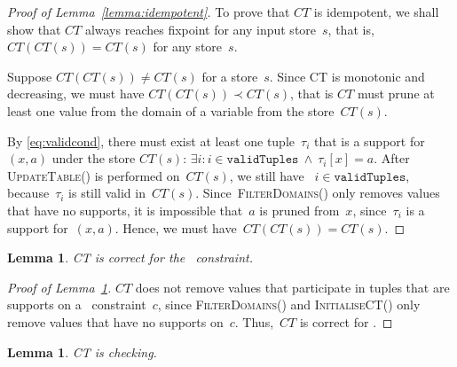 \documentclass[a4paper,11pt]{article}
\newtheorem{lemma}[theorem]{Lemma}
\newcommand{\Table}{\Constraint{Table}}
\newcommand{\Lemmaref}[1]{Lemma~\ref{#1}}
\newcommand{\Eqref}[1]{\eqref{#1}}
\newcommand{\CurrTable}{\texttt{validTuples}}
\def\UpdateTable{\textsc{UpdateTable}}
\def\FilterDomains{\textsc{FilterDomains}}
\def\InitialiseCT{\textsc{InitialiseCT}}
\numberwithin{equation}{section}
\begin{document}
\begin{proof}[Proof of \Lemmaref{lemma:idempotent}]
  To prove that $CT$ is idempotent, we shall show that $CT$ always reaches
  fixpoint for any input store~$s$, that is, $CT(CT(s)) = CT(s)$ for any
  store~$s$.

  Suppose $CT(CT(s)) \neq CT(s)$ for a store~$s$. 
  Since CT is monotonic
  and decreasing, we must have $CT(CT(s)) \prec CT(s)$, that is $CT$
  must prune at least one value from the domain of a variable from the 
  store~$CT(s)$. 

  By \Eqref{eq:validcond}, there must exist at least one 
  tuple~$\tau_i$
  that is a support for~$(x,a)$ under the store $CT(s)$: 
  $\exists i: i \in \CurrTable \ \land \ \tau_i[x] = a$.
  After \UpdateTable() is performed on~$CT(s)$, we still have
  ~$i \in \CurrTable$, because~$\tau_i$ is still valid in~$CT(s)$.
  Since~\FilterDomains() only removes values that have no supports,
  it is impossible that~$a$ is pruned from~$x$, since~$\tau_i$ is a
  support for~$(x,a)$. Hence, we must have~$CT(CT(s)) = CT(s)$.
\end{proof}


\begin{lemma}\label{lemma:correct}
  CT is correct for the \Table~constraint.
\end{lemma}

\begin{proof}[Proof of \Lemmaref{lemma:correct}]
  $CT$ does not remove values that participate in tuples that are supports
  on a \Table~constraint~$c$,
  since \FilterDomains() and \InitialiseCT() only remove values that 
  have no supports on~$c$. Thus,~$CT$ is correct for \Table.
\end{proof}

\begin{lemma}\label{lemma:checking}
  CT is checking.
\end{lemma}
\end{document}
